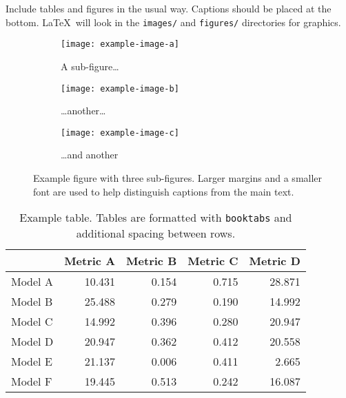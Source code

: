 
Include tables and figures in the usual way. Captions should be placed at the bottom.
\LaTeX\ will look in the \texttt{images/} and \texttt{figures/} directories for graphics.

\begin{figure}[h]
  \centering
  \begin{subfigure}[t]{0.3\textwidth}
    \texttt{[image: example-image-a]}
    \caption{A sub-figure\dots}
    \label{fig:test-a}
  \end{subfigure}
  \begin{subfigure}[t]{0.3\textwidth}
    \texttt{[image: example-image-b]}
    \caption{\dots another\dots}
    \label{fig:test-b}
  \end{subfigure}
  \begin{subfigure}[t]{0.3\textwidth}
    \texttt{[image: example-image-c]}
    \caption{\dots and another}
    \label{fig:test-c}
  \end{subfigure}
  \caption{Example figure with three sub-figures. Larger margins and a smaller font are
  used to help distinguish captions from the main text.}
  \label{fig:test}
\end{figure}

\begin{table}[h]
  \centering
  \begin{tabular}{l r r r r}
  \toprule
  & Metric A & Metric B & Metric C & Metric D\\
  \midrule
  Model A & 10.431 & 0.154 & 0.715 & 28.871\\
  Model B & 25.488 & 0.279 & 0.190 & 14.992\\
  Model C & 14.992 & 0.396 & 0.280 & 20.947\\
  Model D & 20.947 & 0.362 & 0.412 & 20.558\\
  Model E & 21.137 & 0.006 & 0.411 & 2.665\\
  Model F & 19.445 & 0.513 & 0.242 & 16.087\\
  \bottomrule
  \end{tabular}
  \caption{Example table. Tables are formatted with \texttt{booktabs} and additional spacing
  between rows.}
  \label{tbl:test}
\end{table}


